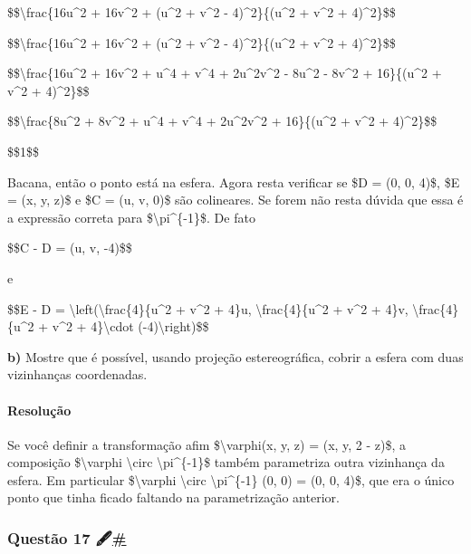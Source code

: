 \$\$\textbackslash{}frac\{16u\^{}2 + 16v\^{}2 + (u\^{}2 + v\^{}2 -
4)\^{}2\}\{(u\^{}2 + v\^{}2 + 4)\^{}2\}\$\$

\$\$\textbackslash{}frac\{16u\^{}2 + 16v\^{}2 + (u\^{}2 + v\^{}2 -
4)\^{}2\}\{(u\^{}2 + v\^{}2 + 4)\^{}2\}\$\$

\$\$\textbackslash{}frac\{16u\^{}2 + 16v\^{}2 + u\^{}4 + v\^{}4 +
2u\^{}2v\^{}2 - 8u\^{}2 - 8v\^{}2 + 16\}\{(u\^{}2 + v\^{}2 +
4)\^{}2\}\$\$

\$\$\textbackslash{}frac\{8u\^{}2 + 8v\^{}2 + u\^{}4 + v\^{}4 +
2u\^{}2v\^{}2 + 16\}\{(u\^{}2 + v\^{}2 + 4)\^{}2\}\$\$

\$\$1\$\$

Bacana, então o ponto está na esfera. Agora resta verificar se \$D = (0,
0, 4)\$, \$E = (x, y, z)\$ e \$C = (u, v, 0)\$ são colineares. Se forem
não resta dúvida que essa é a expressão correta para
\$\textbackslash{}pi\^{}\{-1\}\$. De fato

\$\$C - D = (u, v, -4)\$\$

e

\$\$E - D = \textbackslash{}left(\textbackslash{}frac\{4\}\{u\^{}2 +
v\^{}2 + 4\}u, \textbackslash{}frac\{4\}\{u\^{}2 + v\^{}2 + 4\}v,
\textbackslash{}frac\{4\}\{u\^{}2 + v\^{}2 + 4\}\textbackslash{}cdot
(-4)\textbackslash{}right)\$\$

\textbf{b)} Mostre que é possível, usando projeção estereográfica,
cobrir a esfera com duas vizinhanças coordenadas.

\hypertarget{resoluuxe7uxe3o-8}{%
\paragraph{Resolução}\label{resoluuxe7uxe3o-8}}

Se você definir a transformação afim \$\textbackslash{}varphi(x, y, z) =
(x, y, 2 - z)\$, a composição \$\textbackslash{}varphi
\textbackslash{}circ \textbackslash{}pi\^{}\{-1\}\$ também parametriza
outra vizinhança da esfera. Em particular \$\textbackslash{}varphi
\textbackslash{}circ \textbackslash{}pi\^{}\{-1\} (0, 0) = (0, 0, 4)\$,
que era o único ponto que tinha ficado faltando na parametrização
anterior.

\hypertarget{questuxe3o-17-}{%
\subsubsection{\texorpdfstring{Questão 17
🖋️\protect\hyperlink{questuxe3o-17-}{\#}}{Questão 17 🖋️\#}}\label{questuxe3o-17-}}

